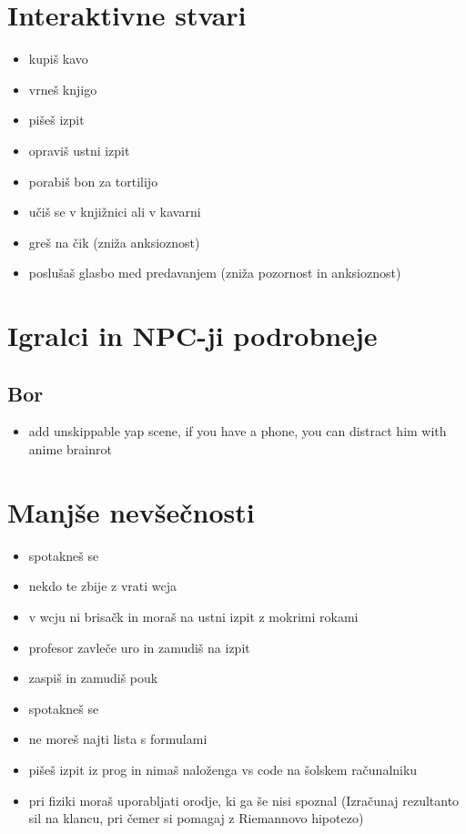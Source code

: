 \documentclass[a4paper]{article}
\begin{document}
\section{Interaktivne stvari}
\begin{itemize}
    \item kupiš kavo
    \item vrneš knjigo
    \item pišeš izpit
    \item opraviš ustni izpit
    \item porabiš bon za tortilijo
    \item učiš se v knjižnici ali v kavarni
    \item greš na čik (zniža anksioznost)
    \item poslušaš glasbo med predavanjem (zniža pozornost in anksioznost)
\end{itemize}

\section{Igralci in NPC-ji podrobneje}
\subsection*{Bor}
\begin{itemize}
    \item add unskippable yap scene, if you have a phone, you can distract him with anime brainrot
\end{itemize}

\section{Manjše nevšečnosti}
\begin{itemize}
    \item spotakneš se
    \item nekdo te zbije z vrati wcja
    \item v wcju ni brisačk in moraš na ustni izpit z mokrimi rokami
    \item profesor zavleče uro in zamudiš na izpit
    \item zaspiš in zamudiš pouk
    \item spotakneš se
    \item ne moreš najti lista s formulami
    \item pišeš izpit iz prog in nimaš naloženga vs code na šolskem računalniku
    \item pri fiziki moraš uporabljati orodje, ki ga še nisi spoznal (Izračunaj rezultanto sil na klancu, pri čemer si pomagaj z Riemannovo hipotezo)
\end{itemize}
\end{document}
